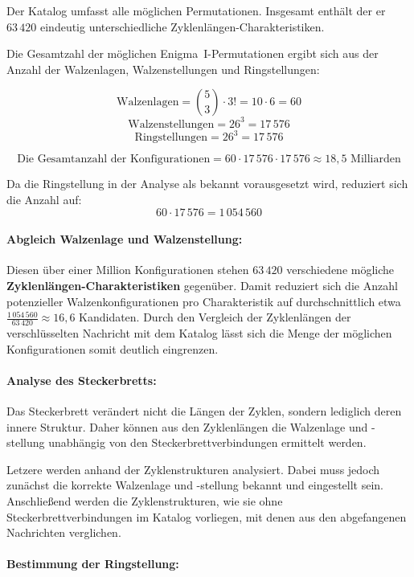 \documentclass[12pt, ngerman, a4paper, numbers=noenddot]{article}
\begin{document}
Der Katalog umfasst alle möglichen Permutationen. Insgesamt enthält der er \(63\,420\) eindeutig unterschiedliche Zyklenlängen-Charakteristiken.



\newpage
Die Gesamtzahl der möglichen Enigma~I-Permutationen ergibt sich aus der Anzahl der Walzenlagen, Walzenstellungen und Ringstellungen:

\[
\text{Walzenlagen} = \binom{5}{3} \cdot 3! = 10 \cdot 6 = 60
\]
\[
\text{Walzenstellungen} = 26^3 = 17\,576
\]
\[
\text{Ringstellungen} = 26^3 = 17\,576
\]

\[
\text{Die Gesamtanzahl der Konfigurationen} = 60 \cdot 17\,576 \cdot 17\,576 \approx 18{,}5 \text{ Milliarden}
\]

Da die Ringstellung in der Analyse als bekannt vorausgesetzt wird, reduziert sich die Anzahl auf:
\[
60 \cdot 17\,576 = 1\,054\,560
\]

\paragraph{Abgleich Walzenlage und Walzenstellung:}

Diesen über einer Million Konfigurationen stehen \(63\,420\) verschiedene mögliche \textbf{Zyklenlängen\hyp{}Charakteristiken} gegenüber. Damit reduziert sich die Anzahl potenzieller Walzenkonfigurationen pro Charakteristik auf durchschnittlich etwa \(\frac{1\,054\,560}{63\,420} \approx 16{,}6\) Kandidaten. Durch den Vergleich der Zyklenlängen der verschlüsselten Nachricht mit dem Katalog lässt sich die Menge der möglichen Konfigurationen somit deutlich eingrenzen.


\paragraph{Analyse des Steckerbretts:}

Das Steckerbrett verändert nicht die Längen der Zyklen, sondern lediglich deren innere Struktur. Daher können aus den Zyklenlängen die Walzenlage und -stellung unabhängig von den Steckerbrettverbindungen ermittelt werden.

Letzere werden anhand der Zyklenstrukturen analysiert. Dabei muss jedoch zunächst die korrekte Walzenlage und -stellung bekannt und eingestellt sein. Anschließend werden die Zyklenstrukturen, wie sie ohne Steckerbrettverbindungen im Katalog vorliegen, mit denen aus den abgefangenen Nachrichten verglichen.

\paragraph{Bestimmung der Ringstellung:}
\end{document}
